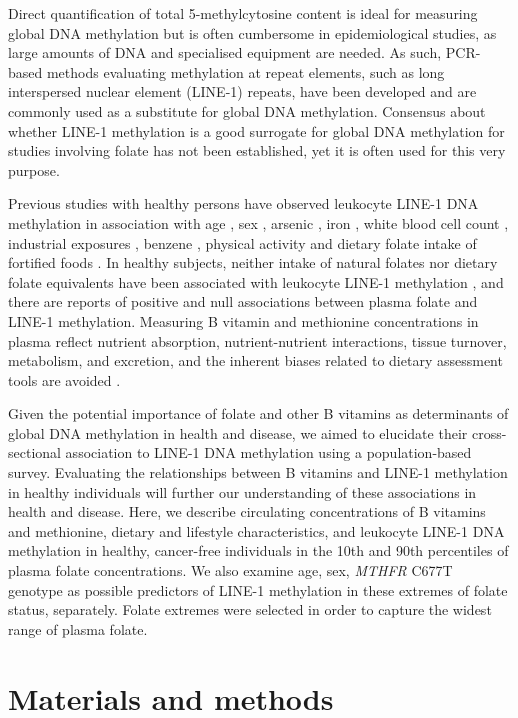 \noindent Direct quantification of total 5-methylcytosine content is ideal for measuring global DNA methylation but is often cumbersome in epidemiological studies, as large amounts of DNA and specialised equipment are needed. As such, PCR-based methods evaluating methylation at repeat elements, such as long interspersed nuclear element (LINE-1) repeats, have been developed and are commonly used as a substitute for global DNA methylation. Consensus about whether LINE-1 methylation is a good surrogate for global DNA methylation for studies involving folate has not been established, yet it is often used for this very purpose.

\noindent Previous studies with healthy persons have observed leukocyte LINE-1 DNA methylation in association with age \cite{c37,c38,c39}, sex \cite{c310,c313}, arsenic \cite{c311}, iron \cite{c311}, white blood cell count \cite{c310}, industrial exposures \cite{c314}, benzene \cite{c315}, physical activity \cite{c316} and dietary folate intake of fortified foods \cite{c317}. In healthy subjects, neither intake of natural folates nor dietary folate equivalents have been associated with leukocyte LINE-1 methylation \cite{c317}, and there are reports of positive \cite{c318} and null associations \cite{c319} between plasma folate and LINE-1 methylation. Measuring B vitamin and methionine concentrations in plasma reflect nutrient absorption, nutrient-nutrient interactions, tissue turnover, metabolism, and excretion, and the inherent biases related to dietary assessment tools are avoided \cite{c320}.

\noindent Given the potential importance of folate and other B vitamins as determinants of global DNA methylation in health and disease, we aimed to elucidate their cross-sectional association to LINE-1 DNA methylation using a population-based survey. Evaluating the relationships between B vitamins and LINE-1 methylation in healthy individuals will further our understanding of these associations in health and disease. Here, we describe circulating concentrations of B vitamins and methionine, dietary and lifestyle characteristics, and leukocyte LINE-1 DNA methylation in healthy, cancer-free individuals in the 10th and 90th percentiles of plasma folate concentrations. We also examine age, sex, \emph{MTHFR} C677T genotype as possible predictors of LINE-1 methylation in these extremes of folate status, separately. Folate extremes were selected in order to capture the widest range of plasma folate. 

\section{Materials and methods} %
